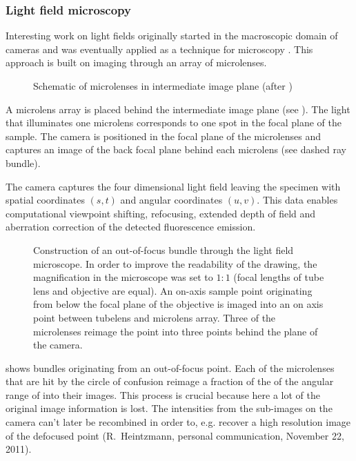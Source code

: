 \subsubsection{Light field microscopy}
Interesting work on light fields originally started in the macroscopic
domain of cameras \citep{Lippmann1908%
} and was eventually
applied as a technique for microscopy
\citep{Levoy2006,Levoy2009}. This approach is built on imaging through
an array of microlenses.
\begin{figure}[!hbt]
  \centering
  
  \caption{Schematic of microlenses in intermediate image plane (after
    \citep{Levoy2006})}
  \label{fig:microlens-levoy-sketch}
\end{figure}

A microlens array is placed behind the intermediate image plane (see
). The light that illuminates one
microlens corresponds to one spot in the focal plane of the
sample. The camera is positioned in the focal plane of the microlenses
and captures an image of the back focal plane behind each microlens
(see dashed ray bundle).

The camera captures the four dimensional light field leaving the
specimen with spatial coordinates $(s,t)$ and angular coordinates
$(u,v)$. This data enables computational viewpoint shifting,
refocusing, extended depth of field and aberration correction of the
detected fluorescence emission.


\begin{figure}[!hbt]
  \centering
  
  \caption{Construction of an out-of-focus bundle through the light
    field microscope. In order to improve the readability of the
    drawing, the magnification in the microscope was set to $1:1$
    (focal lengths of tube lens and objective are equal). An on-axis
    sample point originating from below the focal plane of the
    objective is imaged into an on axis point between tubelens and
    microlens array. Three of the microlenses reimage the point into
    three points behind the plane of the camera.}
  \label{fig:microlens-levoy-sketch_2}
\end{figure}

 shows bundles originating from
an out-of-focus point. Each of the microlenses that are hit by the
circle of confusion reimage a fraction of the of the angular range of
into their images.  This process is crucial because here a lot of the
original image information is lost. The intensities from the
sub-images on the camera can't later be recombined in order to,
e.g. recover a high resolution image of the defocused point
(R.~Heintzmann, personal communication, November 22, 2011).

